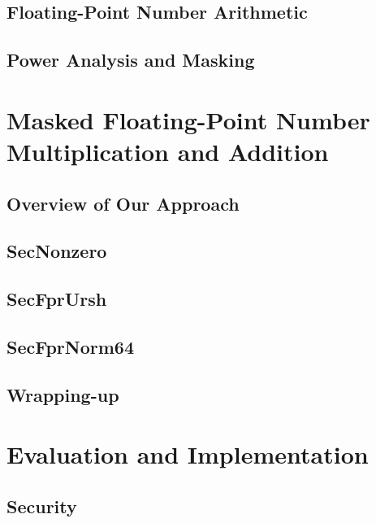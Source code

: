 \subsection{Floating-Point Number Arithmetic}


\subsection{Power Analysis and Masking}

%

\section{Masked Floating-Point Number Multiplication and Addition}
\subsection{Overview of Our Approach}


\subsection{SecNonzero}


\subsection{SecFprUrsh}


\subsection{SecFprNorm64}


\subsection*{Wrapping-up}

%
%



\section{Evaluation and Implementation}

\subsection{Security}


